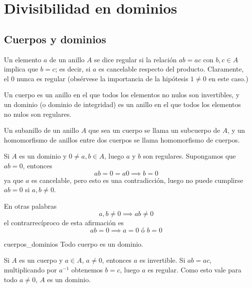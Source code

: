\clearpage

\chapter{Divisibilidad en dominios}

\section{Cuerpos y dominios}

\begin{definition}{}{}
Un elemento \(a\) de un anillo \(A\) se dice regular si la relación \(ab = ac\) con \(b, c \in A\) implica que \(b = c\); es decir, si \(a\) es cancelable respecto del producto. Claramente, el 0 nunca es regular (obsérvese la importancia de la hipótesis \(1 \neq 0\) en este caso.)

Un cuerpo es un anillo en el que todos los elementos no nulos son invertibles, y un dominio (o dominio de integridad) es un anillo en el que todos los elementos no nulos son regulares.

Un subanillo de un anillo \(A\) que sea un cuerpo se llama un subcuerpo de \(A\), y un homomorfismo de anillos entre dos cuerpos se llama homomorfismo de cuerpos.
\end{definition}

\begin{remark}
    Si $A$ es un dominio y $0 \neq a,b \in A$, luego $a$ y $b$ son regulares. Supongamos que $ab = 0$, entonces
    \[
    ab = 0 = a0 \implies b = 0
    \]
    ya que $a$ es cancelable, pero esto es una contradicción, luego no puede cumplirse $ab = 0$ si $a,b \neq 0$.
    
    En otras palabras 
    \[
    a,b \neq 0 \implies ab \neq 0 
    \]
    el contrarrecíproco de esta afirmación es
    \[
    ab = 0 \implies a = 0 \text{ ó } b = 0
    \]
\end{remark}

\begin{proposition}{}{cuerpos_dominios}
Todo cuerpo es un dominio.
\end{proposition}

\begin{proofbox}
Si \(A\) es un cuerpo y \(a \in A\), \(a \neq 0\), entonces \(a\) es invertible. Si \(ab = ac\), multiplicando por \(a^{-1}\) obtenemos \(b = c\), luego \(a\) es regular. Como esto vale para todo \(a \neq 0\), \(A\) es un dominio.
\end{proofbox}

